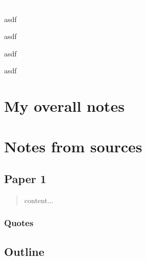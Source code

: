 \documentclass[12pt]{article}
\begin{document}



	

	



	

	{\textcolor{white}.}

	

\begin{outline}[enumerate]

	\1 asdf

		\2 asdf

			\3 asdf

				\4 asdf

\end{outline}



\pagebreak



\section*{My overall notes}





\pagebreak



\section{Notes from sources}



	\subsection*{Paper 1}



		\begin{abstract}

			content...

		\end{abstract}

			\subsubsection{Quotes}



			\subsection*{Outline}
\end{document}
